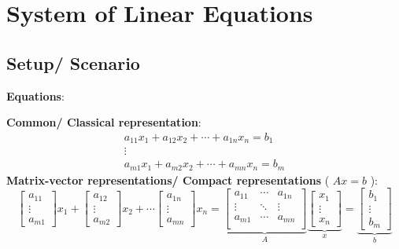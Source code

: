 

\section{System of Linear Equations \cite{mfml-1}}\label{System of Linear Equations}

\subsection*{Setup/ Scenario}

\textbf{Equations}:

\noindent\textbf{Common/ Classical representation}:
\[
    \begin{matrix}
        a_{11}x_1 + a_{12}x_2 + \cdots + a_{1n}x_n = b_1\\
        \vdots \\
        a_{m1}x_1 + a_{m2}x_2 + \cdots + a_{mn}x_n = b_m
    \end{matrix}
\]       
\textbf{Matrix-vector representations/ Compact representations} ( $Ax=b$ ):
\[
    \begin{bmatrix}
        a_{11}\\ \vdots\\ a_{m1}
    \end{bmatrix} x_1 +
    \begin{bmatrix}
        a_{12}\\ \vdots\\ a_{m2}
    \end{bmatrix} x_2 +
    \cdots
    \begin{bmatrix}
        a_{1n}\\ \vdots\\ a_{mn}
    \end{bmatrix} x_n
    =
    \underset{A}{
        \underbrace{
            \begin{bmatrix}
                a_{11} & \cdots & a_{1n}\\
                \vdots & \ddots & \vdots \\
                a_{m1} & \cdots & a_{mn}\\
            \end{bmatrix}
        }
    }
    \underset{x}{
        \underbrace{
            \begin{bmatrix}
                x_1 \\ \vdots \\ x_n
            \end{bmatrix}
        }
    }
    =
    \underset{b}{
        \underbrace{
            \begin{bmatrix}
                b_{1}\\ \vdots\\ b_{m}
            \end{bmatrix}
        }
    }
\]

